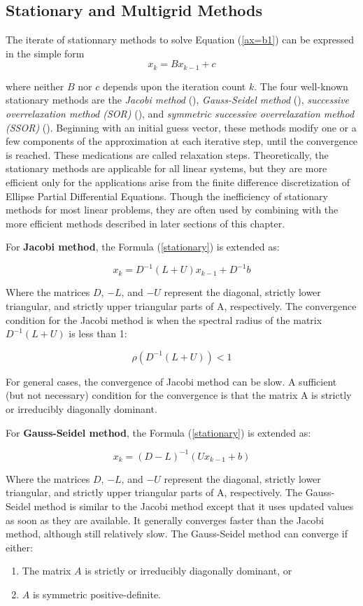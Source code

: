 \subsection{Stationary and Multigrid Methods}

The iterate of stationnary methods to solve Equation (\ref{ax=b1}) can be expressed in the simple form
\begin{equation}
\label{stationary}
x_k = Bx_{k-1}+c
\end{equation}

where neither $B$ nor $c$ depends upon the iteration count $k$. The four well-known stationary methods are the \textit{Jacobi method} (\cite{yang2014acceleration}), \textit{Gauss-Seidel method} (\cite{yoon1988lower}), \textit{successive overrelaxation method (SOR)} (\cite{adams1982multi}), and \textit{symmetric successive overrelaxation method (SSOR)} (\cite{axelsson1972generalized}). Beginning with an initial guess vector, these methods modify one or a few components of the approximation at each iterative step, until the convergence is reached. These medications are called relaxation steps. Theoretically, the stationary methods are applicable for all linear systems, but they are more efficient only for the applications arise from the finite difference discretization of Ellipse Partial Differential Equations. Though the inefficiency of stationary methods for most linear problems, they are often used by combining with the more efficient methods described in later sections of this chapter.

For \textbf{Jacobi method}, the Formula (\ref{stationary}) is extended as:

\[x_k = D^{-1}(L+U)x_{k-1}+D^{-1}b\]

Where the matrices $D$, $-L$, and $-U$ represent the diagonal, strictly lower triangular, and strictly upper triangular parts of A, respectively. The convergence condition for the Jacobi method is when the spectral radius of the matrix $D^{-1}(L+U)$ is less than 1:

\[\rho(D^{-1}(L+U)) < 1\]

For general cases, the convergence of Jacobi method can be slow. A sufficient (but not necessary) condition for the convergence is that the matrix A is strictly or irreducibly diagonally dominant.

For \textbf{Gauss-Seidel method}, the Formula (\ref{stationary}) is extended as:

\[x_k = (D-L)^{-1}(Ux_{k-1}+b)\]

Where the matrices $D$, $-L$, and $-U$ represent the diagonal, strictly lower triangular, and strictly upper triangular parts of A, respectively. The Gauss-Seidel method is similar to the Jacobi method except that it uses updated values as soon as they are available. It generally converges faster than the Jacobi method, although still relatively slow. 
The Gauss-Seidel method can converge if either:
\begin{enumerate}
	\item The matrix $A$ is strictly or irreducibly diagonally dominant, or
	\item $A$ is symmetric positive-definite.
\end{enumerate}


